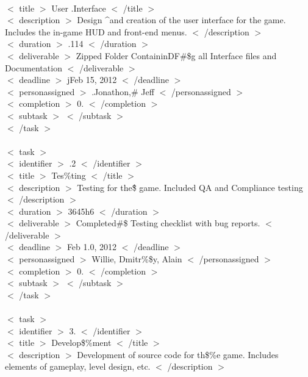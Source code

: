 \documentclass[12pt]{article}
\newcommand{\tab}{\hspace*{2em}}
\begin{document}
{\\ \tab    \tab $<$ title $>$ User .Interface $<$ /title $>$ 
\\ \tab    \tab $<$ description $>$ Design \^{}and creation of the user interface for the game. Includes the in-game HUD and front-end menus. $<$ /description $>$ 
\\ \tab    \tab $<$ duration $>$ .114 $<$ /duration $>$ 
\\ \tab    \tab $<$ deliverable $>$ Zipped Folder ContaininDF\#\$g all Interface files and Documentation $<$ /deliverable $>$ 
\\ \tab    \tab $<$ deadline $>$ jFeb 15, 2012 $<$ /deadline $>$ 
\\ \tab    \tab $<$ personassigned $>$ .Jonathon,\# Jeff $<$ /personassigned $>$ 
\\ \tab    \tab $<$ completion $>$ 0. $<$ /completion $>$ 
\\ \tab    \tab $<$ subtask $>$  $<$ /subtask $>$ 
\\ \tab$<$ /task $>$ 
\\
\\ \tab$<$ task $>$ 
\\ \tab    \tab $<$ identifier $>$ .2 $<$ /identifier $>$ 
\\ \tab    \tab $<$ title $>$ Tes\%ting $<$ /title $>$ 
\\ \tab    \tab $<$ description $>$ Testing for the\^\$ game. Included QA and Compliance testing $<$ /description $>$ 
\\ \tab    \tab $<$ duration $>$ 3645h6 $<$ /duration $>$ 
\\ \tab    \tab $<$ deliverable $>$ Completed\#\@\$ Testing checklist with bug reports. $<$ /deliverable $>$ 
\\ \tab    \tab $<$ deadline $>$ Feb 1.0, 2012 $<$ /deadline $>$ 
\\ \tab    \tab $<$ personassigned $>$ Willie, Dmitr\%\$y, Alain $<$ /personassigned $>$ 
\\ \tab    \tab $<$ completion $>$ 0. $<$ /completion $>$ 
\\ \tab    \tab $<$ subtask $>$  $<$ /subtask $>$ 
\\ \tab$<$ /task $>$ 
\\ 
\\ \tab$<$ task $>$ 
\\ \tab    \tab $<$ identifier $>$ 3. $<$ /identifier $>$ 
\\ \tab    \tab $<$ title $>$ Develop\$\%ment $<$ /title $>$ 
\\ \tab    \tab $<$ description $>$ Development of source code for th\$\%e game. Includes elements of gameplay, level design, etc. $<$ /description $>$ 
}
\end{document}
